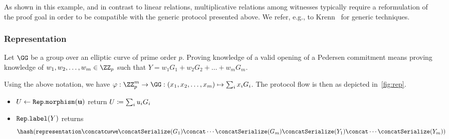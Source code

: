 \documentclass[11pt]{article}
\begin{document}
As shown in this example, and in contrast to linear relations, multiplicative relations among witnesses typically require a reformulation of the proof goal in order to be compatible with the generic protocol presented above.
We refer, e.g., to Krenn~\cite{krenn12} for generic techniques.


\subsubsection{Representation}
Let $\GG$ be a group over an elliptic curve of prime order $p$.
Proving knowledge of a valid opening of a Pedersen commitment means proving knowledge of $w_1,w_2, \dots, w_m\in\ZZ_p$ such that $Y=w_1G_1 + w_2G_2 + \dots + w_m G_m$.

Using the above notation, we have $\varphi:\ZZ_p^m\to\GG:(x_1,x_2, \dots, x_m)\mapsto \sum_i x_iG_i$.
The protocol flow is then as depicted in~\cref{fig:rep}.


\begin{itemize}
  \item $U \gets \texttt{Rep}.\texttt{morphism}(\mathbf u)$ return $U \coloneqq \sum_i u_i G_i$
  \item $\texttt{Rep}.\texttt{label}(Y)$ returns
  \[
    \hash(\replabel \concat \curvectx \concat \serialize(G_1) \concat \cdots \concat \serialize(G_m) \concat \serialize(Y_1) \concat \cdots \concat \serialize(Y_m))
  \]
\end{itemize}
\end{document}
